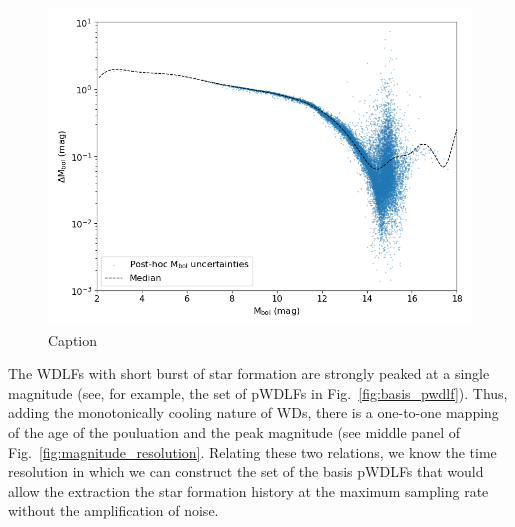 \documentclass[fleqn,usenatbib]{mnras}
\begin{document}
\begin{figure}
    \includegraphics[width=\columnwidth]{figures/fig_03_mbol_sigma.png}
    \caption{Caption}
    \label{fig:mbol_sigma}
\end{figure}

The WDLFs with short burst of star formation are strongly peaked at a single
magnitude (see, for example, the set of pWDLFs in Fig.~\ref{fig:basis_pwdlf}).
Thus, adding the monotonically cooling nature of WDs, there is a one-to-one
mapping of the age of the pouluation and the peak magnitude (see middle panel
of Fig.~\ref{fig:magnitude_resolution}. Relating these two relations, we know
the time resolution in which we can construct the set of the basis pWDLFs that
would allow the extraction the star formation history at the maximum sampling
rate without the amplification of noise.
\end{document}

